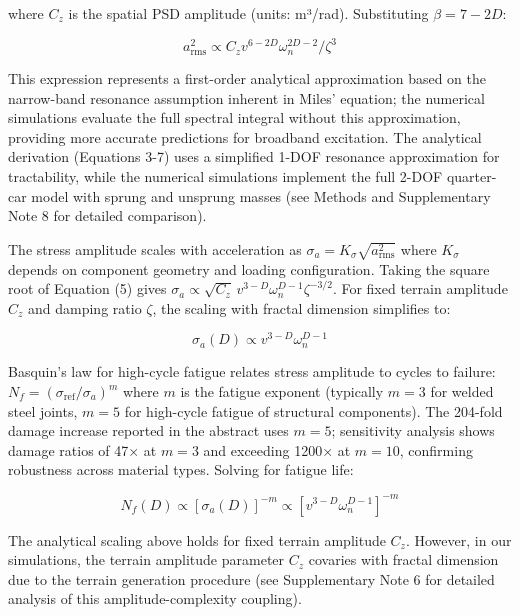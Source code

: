 \documentclass[11pt]{article}
\begin{document}
where $C_z$ is the spatial PSD amplitude (units: m³/rad). Substituting $\beta = 7-2D$:

\begin{equation}
a_{\text{rms}}^2 \propto C_z v^{6-2D} \omega_n^{2D-2} / \zeta^3
\end{equation}

This expression represents a first-order analytical approximation based on the narrow-band resonance assumption inherent in Miles' equation; the numerical simulations evaluate the full spectral integral without this approximation, providing more accurate predictions for broadband excitation. The analytical derivation (Equations 3-7) uses a simplified 1-DOF resonance approximation for tractability, while the numerical simulations implement the full 2-DOF quarter-car model with sprung and unsprung masses (see Methods and Supplementary Note 8 for detailed comparison).

The stress amplitude scales with acceleration as $\sigma_a = K_\sigma \sqrt{a_{\text{rms}}^2}$ where $K_\sigma$ depends on component geometry and loading configuration. Taking the square root of Equation (5) gives $\sigma_a \propto \sqrt{C_z} \, v^{3-D} \omega_n^{D-1} \zeta^{-3/2}$. For fixed terrain amplitude $C_z$ and damping ratio $\zeta$, the scaling with fractal dimension simplifies to:

\begin{equation}
\sigma_a(D) \propto v^{3-D} \omega_n^{D-1}
\end{equation}

Basquin's law for high-cycle fatigue relates stress amplitude to cycles to failure: $N_f = (\sigma_{\text{ref}}/\sigma_a)^m$ where $m$ is the fatigue exponent (typically $m = 3$ for welded steel joints, $m = 5$ for high-cycle fatigue of structural components)\cite{Basquin1910,Dowling2013}. The 204-fold damage increase reported in the abstract uses $m = 5$; sensitivity analysis shows damage ratios of 47× at $m = 3$ and exceeding 1200× at $m = 10$, confirming robustness across material types. Solving for fatigue life:

\begin{equation}
N_f(D) \propto [\sigma_a(D)]^{-m} \propto [v^{3-D} \omega_n^{D-1}]^{-m}
\end{equation}

The analytical scaling above holds for fixed terrain amplitude $C_z$. However, in our simulations, the terrain amplitude parameter $C_z$ covaries with fractal dimension due to the terrain generation procedure (see Supplementary Note 6 for detailed analysis of this amplitude-complexity coupling). 
\end{document}
